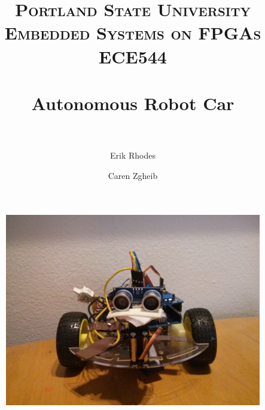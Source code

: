 \documentclass[11pt]{article}
\title{	
\normalfont \normalsize 
\textsc{\LARGE Portland State University}\\[1.5cm] %
\textsc{\Large Embedded Systems on FPGAs}\\[0.5cm] %
\textsc{\large ECE544}\\[0.5cm] %
\horrule{1.2pt} \\[0.4cm] %
\huge Autonomous Robot Car \\ %
\horrule{1.2pt} \\[0.5cm] %
}
\begin{document}
\raggedright
\author{Erik Rhodes \and Caren Zgheib} %
\maketitle %
\thispagestyle{empty}


\begin{figure}[h]\centering
\includegraphics[height=0.65\textwidth]{images/bot_front.jpg}
		\label{bot_front}
	\end{figure}
	
\tableofcontents
\newpage
\end{document}
